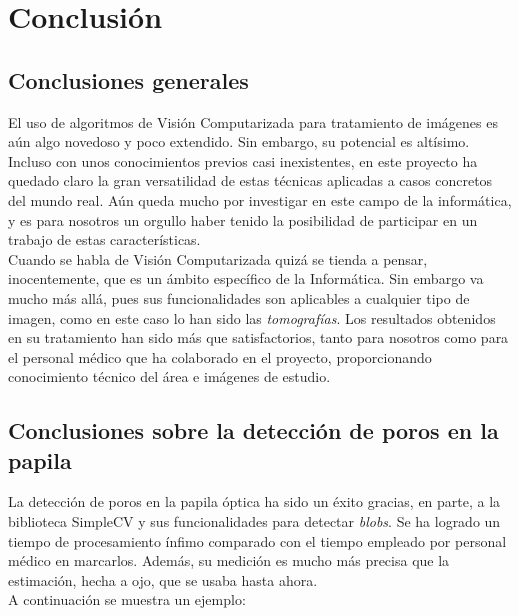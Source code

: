 \chapter{Conclusión}
\section{Conclusiones generales}
El uso de algoritmos de Visión Computarizada para tratamiento de
imágenes es aún algo novedoso y poco extendido. Sin embargo, su
potencial es altísimo. Incluso con unos conocimientos previos
casi inexistentes, en este proyecto ha quedado claro la gran
versatilidad de estas técnicas aplicadas a casos concretos del
mundo real. Aún queda mucho por investigar en este campo de la
informática, y es para nosotros un orgullo haber tenido la 
posibilidad de participar en un trabajo de estas características.\\
Cuando se habla de Visión Computarizada quizá se tienda a pensar,
inocentemente, que es un ámbito específico de la Informática. Sin
embargo va mucho más allá, pues sus funcionalidades son aplicables
a cualquier tipo de imagen, como en este caso lo han sido las 
\emph{tomografías}. Los resultados obtenidos en su tratamiento han
sido más que satisfactorios, tanto para nosotros como para el 
personal médico que ha colaborado en el proyecto, proporcionando
conocimiento técnico del área e imágenes de estudio.

\section{Conclusiones sobre la detección de poros en la papila}
La detección de poros en la papila óptica ha sido un éxito gracias,
en parte, a la biblioteca SimpleCV y sus funcionalidades para 
detectar \emph{blobs}. Se ha logrado un tiempo de procesamiento ínfimo 
comparado con el tiempo empleado por personal médico en marcarlos.
Además, su medición es mucho más precisa que la estimación, hecha
a ojo, que se usaba hasta ahora. \\
A continuación se muestra un ejemplo:


